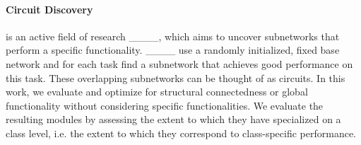 \paragraph{Circuit Discovery} is an active field of research ____, which aims to uncover subnetworks that perform a specific functionality. 
____ use a randomly initialized, fixed base network and for each task find a subnetwork that achieves good performance on this task. 
These overlapping subnetworks can be thought of as circuits.
In this work, we evaluate and optimize for structural connectedness or global functionality without considering specific functionalities.
We evaluate the resulting modules by assessing the extent to which they have specialized on a class level, i.e. the extent to which they correspond to class-specific performance.

